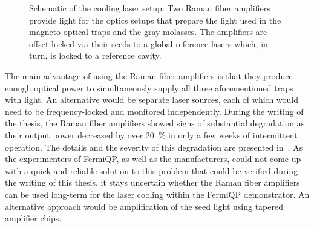 \begin{figure}
    \caption{Schematic of the cooling laser setup: Two Raman fiber amplifiers provide light for the optics setups that prepare the light used in the magneto-optical traps and the gray molasses. The amplifiers are offset-locked via their seeds to a global reference lasers which, in turn, is locked to a reference cavity.
    }\label{fig:laser_interplay_schematic}
\end{figure}


The main advantage of using the Raman fiber amplifiers is that they produce enough optical power to simultaneously supply all three aforementioned traps with light. An alternative would be separate laser sources, each of which would need to be frequency-locked and monitored independently. During the writing of the thesis, the Raman fiber amplifiers showed signs of substantial degradation as their output power decreased by over \SI{20}{\percent} in only a few weeks of intermittent operation. The details and the severity of this degradation are presented in~\cite{qesja_design_2022}. As the experimenters of FermiQP, as well as the manufacturers, could not come up with a quick and reliable solution to this problem that could be verified during the writing of this thesis, it stays uncertain whether the Raman fiber amplifiers can be used long-term for the laser cooling within the FermiQP demonstrator. An alternative approach would be amplification of the seed light using tapered amplifier chips.


